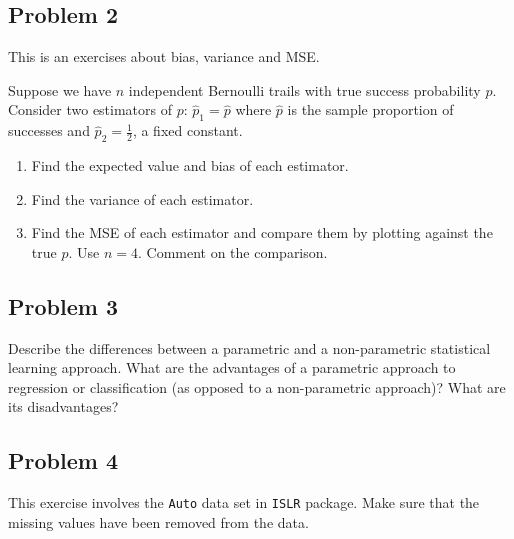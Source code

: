 \documentclass[
]{article}
\providecommand{\tightlist}{%
  \setlength{\itemsep}{0pt}\setlength{\parskip}{0pt}}
\begin{document}
\hypertarget{problem-2}{%
\subsection{Problem 2}\label{problem-2}}

This is an exercises about bias, variance and MSE.

Suppose we have \(n\) independent Bernoulli trails with true success
probability \(p\). Consider two estimators of \(p\):
\(\hat{p}_1 = \hat{p}\) where \(\hat{p}\) is the sample proportion of
successes and \(\hat{p}_2 = \frac{1}{2}\), a fixed constant.

\begin{enumerate}
\def\labelenumi{\alph{enumi})}
\tightlist
\item
  Find the expected value and bias of each estimator.\\
\item
  Find the variance of each estimator.\\
\item
  Find the MSE of each estimator and compare them by plotting against
  the true \(p\). Use \(n = 4\). Comment on the comparison.
\end{enumerate}

\newpage

\hypertarget{problem-3}{%
\subsection{Problem 3}\label{problem-3}}

Describe the differences between a parametric and a non-parametric
statistical learning approach. What are the advantages of a parametric
approach to regression or classification (as opposed to a non-parametric
approach)? What are its disadvantages?

\hypertarget{problem-4}{%
\subsection{Problem 4}\label{problem-4}}

This exercise involves the \texttt{Auto} data set in \texttt{ISLR}
package. Make sure that the missing values have been removed from the
data.
\end{document}
